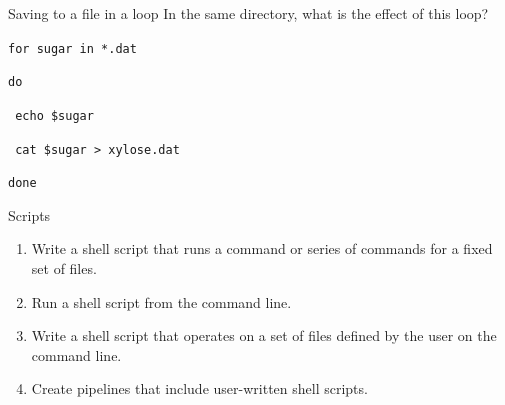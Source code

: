 \documentclass{beamer}
\begin{document}

\begin{frame}{Saving to a file in a loop }
In the same directory, what is the effect of this loop?

\begin{beamerboxesrounded}[upper=uppercolgreen,lower=lowercolgreen,shadow=false]{}
\texttt{for sugar in *.dat}

\texttt{do}

\texttt{	echo \$sugar}

\texttt{	cat \$sugar > xylose.dat}

\texttt{done}
\end{beamerboxesrounded}

\small{
}


\end{frame}

\begin{frame}{Scripts}
\begin{enumerate}
   \item{ Write a shell script that runs a command or series of commands for a fixed set of files.}
   \item{ Run a shell script from the command line.}
   \item{ Write a shell script that operates on a set of files defined by the user on the command line.}
   \item{ Create pipelines that include user-written shell scripts.}
\end{enumerate}
\end{frame}
\end{document}
